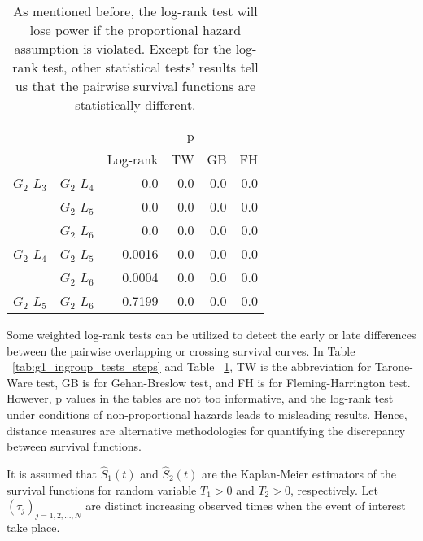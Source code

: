       \begin{table}
        \centering
        \begin{tabular}{llrrrr}
          \toprule
                       &             &         &  p &    &     \\
          \cmidrule{3-6}
                       &             & Log-rank & TW & GB & FH  \\
          \midrule
          $G_2$ $L_3$  & $G_2$ $L_4$  &  0.0 &  0.0 &  0.0 &  0.0     \\
                       & $G_2$ $L_5$  & 0.0 & 0.0 & 0.0 & 0.0    \\
                       & $G_2$ $L_6$  & 0.0 & 0.0 & 0.0 & 0.0      \\
          $G_2$ $L_4$  & $G_2$ $L_5$  & 0.0016 & 0.0 & 0.0 & 0.0      \\
                       & $G_2$ $L_6$  & 0.0004 & 0.0 & 0.0 & 0.0       \\
          $G_2$ $L_5$   & $G_2$ $L_6$ & 0.7199 &  0.0 & 0.0 & 0.0      \\
          \bottomrule
        \end{tabular}
        \caption{As mentioned before, the log-rank test will lose
          power if the proportional hazard assumption is
          violated. Except for the log-rank test, other statistical
          tests' results tell us that the pairwise survival functions
          are statistically different. }
        \label{tab:g2_ingroup_tests_steps}
      \end{table}
      

      Some weighted log-rank tests can be utilized to detect the early
      or late differences between the pairwise overlapping or crossing
      survival curves. In Table ~\ref{tab:g1_ingroup_tests_steps} and
      Table ~\ref{tab:g2_ingroup_tests_steps}, TW is the abbreviation
      for Tarone-Ware test, GB is for Gehan-Breslow test, and FH is
      for Fleming-Harrington test. However, p values in the tables are
      not too informative, and the log-rank test under conditions of
      non-proportional hazards leads to misleading results. Hence,
      distance measures are alternative methodologies for quantifying
      the discrepancy between survival functions.

      It is assumed that $\widehat S_1(t)$ and $\widehat S_2(t)$ are
      the Kaplan-Meier estimators of the survival functions for random
      variable $T_1 > 0$ and $T_2 > 0$, respectively. Let
      $(\tau_j)_{j=1, 2, ..., N}$ are distinct increasing observed
      times when the event of interest take place.

